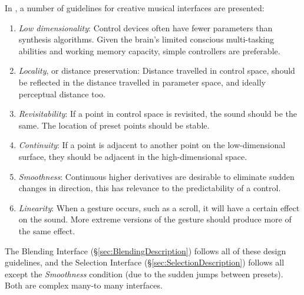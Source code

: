\documentclass[11pt, oneside]{report}   	%
\begin{document}
In \cite{TubbThesis}, a number of guidelines for creative musical interfaces are presented:
\begin{enumerate}
	\vspace{-10pt}
\setlength\itemsep{-1.2em}
	\item \emph{Low dimensionality}: Control devices often have fewer parameters than synthesis algorithms. Given the brain's limited conscious multi-tasking abilities and working memory capacity, simple controllers are preferable.
	\item \emph{Locality}, or distance preservation: Distance travelled in control space, should be reflected in the distance travelled in parameter space, and ideally perceptual distance too.
	\item \emph{Revisitability}: If a point in control space is revisited, the sound should be the same. The location of preset points should be stable.
	\item \emph{Continuity}: If a point is adjacent to another point on the low-dimensional surface, they should be adjacent in the high-dimensional space.
	\item \emph{Smoothness}: Continuous higher derivatives are desirable to eliminate sudden changes in direction, this has relevance to the predictability of a control.
	\item \emph{Linearity}: When a gesture occurs, such as a scroll, it will have a certain effect on the sound. More extreme versions of the gesture should produce more of the same effect. %
	\vspace{-10pt}
\end{enumerate}
The Blending Interface (\S \ref{sec:BlendingDescription}) follows all of these design guidelines, and the Selection Interface (\S \ref{sec:SelectionDescription}) follows all except the \emph{Smoothness} condition (due to the sudden jumps between presets). Both are complex many-to many interfaces.
\end{document}
